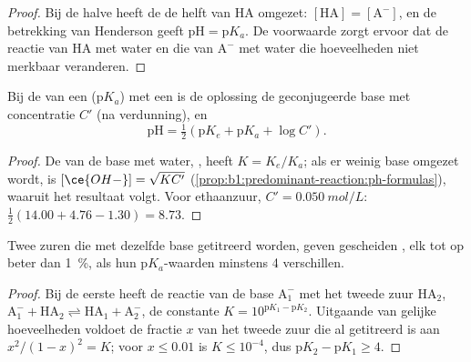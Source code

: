 \begin{proof}
Bij de halve  heeft de 
 de helft van HA omgezet:
$[\mathrm{HA}] = [\mathrm{A^-}]$, en de betrekking van Henderson geeft
$\mathrm{pH} = \mathrm{p}K_a$. De voorwaarde zorgt ervoor dat de reactie
van HA met water en die van $\mathrm{A^-}$ met water die hoeveelheden
niet merkbaar veranderen.
\end{proof}

\begin{proposition}\label{prop:b1:titration-methods:ph-at-equivalence}
Bij de  van een  ($\mathrm{p}K_a$) met een  is de oplossing de geconjugeerde base met concentratie $C'$ (na
verdunning), en
\[
  \mathrm{pH} = \tfrac12(\mathrm{p}K_e + \mathrm{p}K_a + \log C') .
\]
\end{proposition}

\begin{proof}
De  van de base met water,
, heeft $K = K_e/K_a$; als er weinig base
omgezet wordt, is $[\ce{OH-}] = \sqrt{KC'}$
(\cref{prop:b1:predominant-reaction:ph-formulas}), waaruit het resultaat
volgt. Voor ethaanzuur, $C' = \qty{0.050}{mol/L}$:
$\frac12(14.00 + 4.76 - 1.30) = 8.73$.
\end{proof}

\begin{proposition}\label{prop:b1:titration-methods:successive}
Twee zuren die met dezelfde base getitreerd worden, geven gescheiden
, elk tot op beter dan \qty{1}{\percent}, als hun
$\mathrm{p}K_a$-waarden minstens 4 verschillen.
\end{proposition}

\begin{proof}
Bij de eerste  heeft de reactie van de base $\mathrm{A_1^-}$
met het tweede zuur $\mathrm{HA_2}$, $\mathrm{A_1^-} + \mathrm{HA_2}
\rightleftharpoons \mathrm{HA_1} + \mathrm{A_2^-}$, de constante
$K = 10^{\mathrm{p}K_1 - \mathrm{p}K_2}$. Uitgaande van gelijke
hoeveelheden voldoet de fractie $x$ van het tweede zuur die al
getitreerd is aan $x^2/(1 - x)^2 = K$; voor $x \leqslant 0.01$ is $K
\leqslant 10^{-4}$, dus $\mathrm{p}K_2 - \mathrm{p}K_1 \geqslant 4$.
\end{proof}

